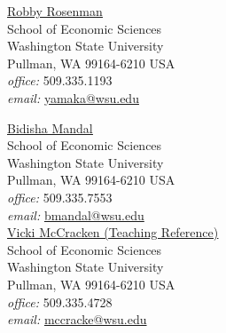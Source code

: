 \documentclass[margin]{res}  %
\begin{document}
\begin{resume}
\begin{table}[ht]
\begin{minipage}[t]{0.5\linewidth}
\href{http://people.ses.wsu.edu/Rosenman/}{\underline{Robby Rosenman}}\\
School of Economic Sciences\\
Washington State University\\
Pullman, WA 99164-6210 USA\\
\emph{office:} 509.335.1193\\
\emph{email:} \href{mailto:yamaka@wsu.edu}{yamaka@wsu.edu}
\end{minipage} %
\hspace{0.5cm} %
\begin{minipage}[t]{0.5\linewidth} %
\vspace{2em}
\href{http://people.ses.wsu.edu/Mandal/}{\underline{Bidisha Mandal}}\\
School of Economic Sciences\\
Washington State University\\
Pullman, WA 99164-6210 USA\\
\emph{office:} 509.335.7553\\
\emph{email:} \href{mailto:bmandal@wsu.edu}{bmandal@wsu.edu}\\

\href{http://people.ses.wsu.edu/McCracken/}{\underline{Vicki McCracken (Teaching Reference)}}\\
School of Economic Sciences\\
Washington State University\\
Pullman, WA 99164-6210 USA\\
\emph{office:} 509.335.4728\\
\emph{email:} \href{mailto:mccracke@wsu.edu}{mccracke@wsu.edu}\\


\end{minipage} %
\end{table}


\end{resume} 
\vspace{5em}
\end{document}

